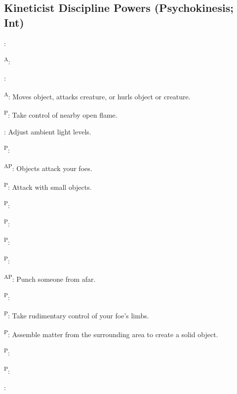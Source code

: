 \subsection{Kineticist Discipline Powers {\normalsize(Psychokinesis; Int)}}
\begin{enumerate*}
\item {}:

      \textsuperscript{A}:

      :

      \textsuperscript{A}: Moves object, attacks creature, or hurls object or creature.

\item {}\textsuperscript{P}: Take control of nearby open flame.

      : Adjust ambient light levels.

      \textsuperscript{P}:
      
\item {}\textsuperscript{AP}: Objects attack your foes.

      \textsuperscript{P}: Attack with small objects.

      \textsuperscript{P}:

      \textsuperscript{P}:

      \textsuperscript{P}:

      \textsuperscript{P}:

      \textsuperscript{AP}: Punch someone from afar.

      \textsuperscript{P}:

\item {}\textsuperscript{P}: Take rudimentary control of your foe's limbs.

      \textsuperscript{P}: Assemble matter from the surrounding area to create a solid object.

      \textsuperscript{P}:

      \textsuperscript{P}:

      :


\end{enumerate*}

